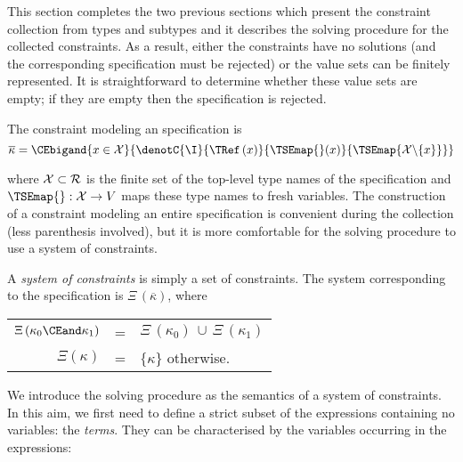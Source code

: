 
This section completes the two previous sections which present the
constraint collection from types and subtypes and it describes the
solving procedure for the collected constraints. As a result, either
the constraints have no solutions (and the corresponding \ASN
specification must be rejected) or the value sets can be finitely
represented. It is straightforward to determine whether these value
sets are empty; if they are empty then the specification is rejected.

The constraint modeling an \ASN specification is 
$$\overline{\kappa} = \CEbigand{x \in {\cal X}}{\denotC{\I}{\TRef \,
(x)}{\TSEmap{}(x)}{\TSEmap{{\cal X} \backslash \{x\}}}}$$

\noindent
where ${\cal X} \subset {\cal R}$ is the finite set of the top-level
type names of the specification and $\TSEmap{} : {\cal X} \rightarrow
V$ maps these type names to fresh variables. The construction of a
constraint modeling an entire specification is convenient during the
collection (less parenthesis involved), but it is more comfortable for
the solving procedure to use a system of constraints.

\begin{Def}\label{systems_of_constraints}
A \emph{system of constraints} is simply a set of constraints. The
system corresponding to the \ASN specification is $\Xi \,
(\overline{\kappa})$, where

\begin{center}
\begin{tabular}{rcl}
    $\Xi \, (\kappa_0 \CEand \kappa_1)$
  & = &
    $\Xi \, (\kappa_0) \, \cup \, \Xi \, (\kappa_1)$\\
    $\Xi (\kappa)$
  & = &
    $\{\kappa\}$ otherwise.
\end{tabular}
\end{center}

\end{Def}

We introduce the solving procedure as the semantics of a system of
constraints. In this aim, we first need to define a strict subset of
the expressions \E{} containing no variables: the \emph{terms}. They
can be characterised by the variables occurring in the expressions:

